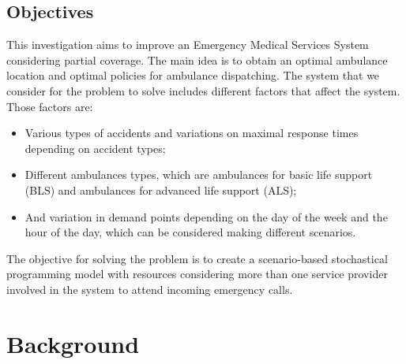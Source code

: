 

\section{Objectives}
This investigation aims to improve an Emergency Medical Services System considering partial coverage. The main idea is to obtain an optimal ambulance location and optimal policies for ambulance dispatching. The system that we consider for the problem to solve includes different factors that affect the system. Those factors are:
\begin{itemize}

\item Various types of accidents and variations on maximal response times depending on accident types; 

\item Different ambulances types, which are ambulances for basic life support (BLS) and ambulances for advanced life support (ALS);

\item And variation in demand points depending on the day of the week and the hour of the day, which can be considered making different scenarios.


\end{itemize} 

The objective for solving the problem is to create a scenario-based stochastical programming model with resources considering more than one service provider in\-vol\-ved in the system to attend incoming emergency calls. 


\chapter{Background}\label{cap:back}

